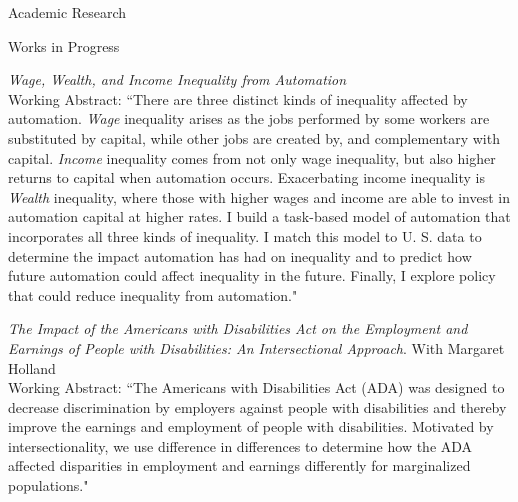 \documentclass{resume} %
\begin{document}
\begin{rSection}{Academic Research}
    \begin{rSubsection}{Works in Progress}{}{}{}
        \item \emph{Wage, Wealth, and Income Inequality from Automation}\\
        Working Abstract: ``There are three distinct kinds of inequality affected by automation. \emph{Wage} inequality arises as the jobs performed by some workers are substituted by capital, while other jobs are created by, and complementary with capital. \emph{Income} inequality comes from not only wage inequality, but also higher returns to capital when automation occurs. Exacerbating income inequality is \emph{Wealth} inequality, where those with higher wages and income are able to invest in automation capital at higher rates. I build a task-based model of automation that incorporates all three kinds of inequality. I match this model to U. S. data to determine the impact automation has had on inequality and to predict how future automation could affect inequality in the future. Finally, I explore policy that could reduce inequality from automation."
        \item \emph{The Impact of the Americans with Disabilities Act on the Employment and Earnings of People with Disabilities: An Intersectional Approach}. With Margaret Holland\\
        Working Abstract: ``The Americans with Disabilities Act (ADA) was designed to decrease discrimination by employers against people with disabilities and thereby improve the earnings and employment of people with disabilities. Motivated by intersectionality, we use difference in differences to determine how the ADA affected disparities in employment and earnings differently for marginalized populations."
        
    \end{rSubsection}

\end{rSection}
\end{document}
